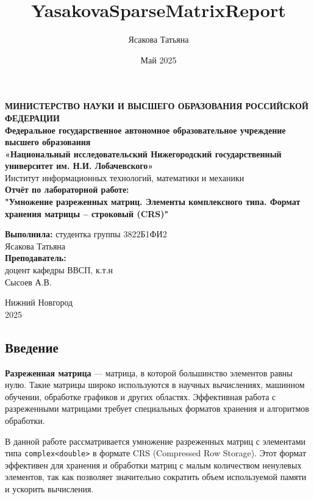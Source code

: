\documentclass[12pt]{article}
\title{YasakovaSparseMatrixReport}
\author{Ясакова Татьяна}
\date{Май 2025}
\begin{document}
\begin{titlepage}
\begin{center}
\textbf{МИНИСТЕРСТВО НАУКИ И ВЫСШЕГО ОБРАЗОВАНИЯ РОССИЙСКОЙ ФЕДЕРАЦИИ} \\
\textbf{Федеральное государственное автономное образовательное учреждение высшего образования \\ «Национальный исследовательский Нижегородский государственный университет им. Н.И. Лобачевского»} \\
Институт информационных технологий, математики и механики \\
\vspace{3cm}
{\Large
\textbf{Отчёт по лабораторной работе:} \\[0.5cm]
\textbf{"Умножение разреженных матриц. Элементы комплексного типа. Формат хранения матрицы – строковый (CRS)"} \\
}
\vspace{2cm}
\begin{flushright}
\textbf{Выполнила:} студентка группы 3822Б1ФИ2\\
Ясакова Татьяна \\
\vspace{0.5cm}
\textbf{Преподаватель:} \\
доцент кафедры ВВСП, к.т.н \\ Сысоев А.В.
\end{flushright}
\vspace{2.5cm}
Нижний Новгород \\
2025
\end{center}
\end{titlepage}

\begin{center}
    \section*{Введение}
\end{center}
\textbf{Разреженная матрица} — матрица, в которой большинство элементов равны нулю. Такие матрицы широко используются в научных вычислениях, машинном обучении, обработке графиков и других областях. Эффективная работа с разреженными матрицами требует специальных форматов хранения и алгоритмов обработки.

В данной работе рассматривается умножение разреженных матриц с элементами типа \texttt{complex<double>} в формате CRS (Compressed Row Storage). Этот формат эффективен для хранения и обработки матриц с малым количеством ненулевых элементов, так как позволяет значительно сократить объем используемой памяти и ускорить вычисления.
\end{document}
